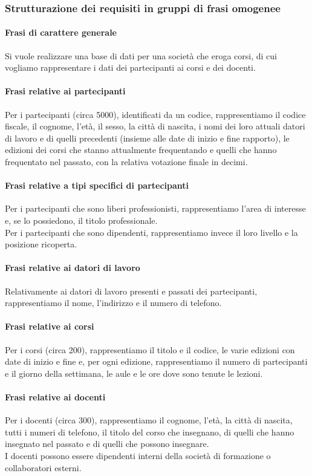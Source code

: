 \documentclass[../main.tex]{subfiles}
\begin{document}
	\subsubsection{Strutturazione dei requisiti in gruppi di frasi omogenee}
	\paragraph{Frasi di carattere generale}
	Si vuole realizzare una base di dati per una società che eroga corsi, di cui vogliamo rappresentare i dati dei partecipanti ai corsi e dei docenti.
	\paragraph{Frasi relative ai partecipanti}
	Per i partecipanti (circa 5000), identificati da un codice, rappresentiamo il codice fiscale, il cognome, l'età, il sesso, la città di nascita, i nomi dei loro attuali datori di lavoro e di quelli precedenti (insieme alle date di inizio e fine rapporto), le edizioni dei corsi che stanno attualmente frequentando e quelli che hanno frequentato nel passato, con la relativa votazione finale in decimi.
	\paragraph{Frasi relative a tipi specifici di partecipanti}
	Per i partecipanti che sono liberi professionisti, rappresentiamo l'area di interesse e, se lo possiedono, il titolo professionale.\\
	Per i partecipanti che sono dipendenti, rappresentiamo invece il loro livello e la posizione ricoperta.
	\paragraph{Frasi relative ai datori di lavoro}
	Relativamente ai datori di lavoro presenti e passati dei partecipanti, rappresentiamo il nome, l'indirizzo e il numero di telefono.
	\paragraph{Frasi relative ai corsi}
	Per i corsi (circa 200), rappresentiamo il titolo e il codice, le varie edizioni con date di inizio e fine e, per ogni edizione, rappresentiamo il numero di partecipanti e il giorno della settimana, le aule e le ore dove sono tenute le lezioni.
	\paragraph{Frasi relative ai docenti}
	Per i docenti (circa 300), rappresentiamo il cognome, l'età, la città di nascita, tutti i numeri di telefono, il titolo del corso che insegnano, di quelli che hanno insegnato nel passato e di quelli che possono insegnare. \\
	I docenti possono essere dipendenti interni della società di formazione o collaboratori esterni.
\end{document}
